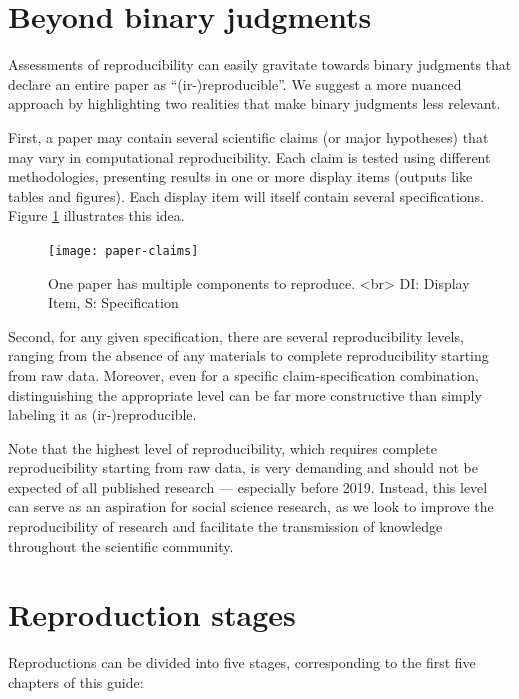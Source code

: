 \documentclass[
]{book}
\begin{document}
\hypertarget{beyond-binary-judgments}{%
\section*{Beyond binary judgments}\label{beyond-binary-judgments}}

Assessments of reproducibility can easily gravitate towards binary judgments that declare an entire paper as ``(ir-)reproducible''. We suggest a more nuanced approach by highlighting two realities that make binary judgments less relevant.

First, a paper may contain several scientific claims (or major hypotheses) that may vary in computational reproducibility. Each claim is tested using different methodologies, presenting results in one or more display items (outputs like tables and figures). Each display item will itself contain several specifications. Figure \ref{fig:diagram} illustrates this idea.

\begin{figure}
\texttt{[image: paper-claims]} \caption{One paper has multiple components to reproduce. <br> DI: Display Item, S: Specification }\label{fig:diagram}
\end{figure}

Second, for any given specification, there are several reproducibility levels, ranging from the absence of any materials to complete reproducibility starting from raw data. Moreover, even for a specific claim-specification combination, distinguishing the appropriate level can be far more constructive than simply labeling it as (ir-)reproducible.

Note that the highest level of reproducibility, which requires complete reproducibility starting from raw data, is very demanding and should not be expected of all published research --- especially before 2019. Instead, this level can serve as an aspiration for social science research, as we look to improve the reproducibility of research and facilitate the transmission of knowledge throughout the scientific community.

\hypertarget{reproduction-stages}{%
\section*{Reproduction stages}\label{reproduction-stages}}

Reproductions can be divided into five stages, corresponding to the first five chapters of this guide:
\end{document}
